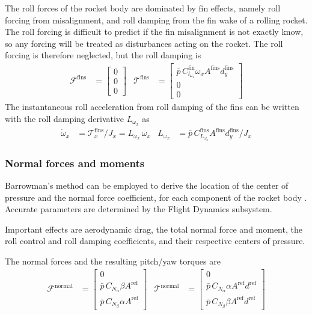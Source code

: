 The roll forces of the rocket body are dominated by fin effects, namely roll forcing from misalignment, and roll damping from the fin wake of a rolling rocket. 
The roll forcing is difficult to predict if the fin misalignment is not exactly know, so any forcing will be treated as disturbances acting on the rocket.
The roll forcing is therefore neglected, but the roll damping is 
\begin{align}
    \mathcal{F}^\text{fins} &= \begin{bmatrix} 0 \\ 0 \\ 0 \end{bmatrix}
    & 
    \mathcal{T}^\text{fins} &= \begin{bmatrix} \bar p \, C^\text{fin}_{l_{\omega_x}} \omega_x A^\text{fins} d^\text{fins}_y \\ 0 \\ 0 \end{bmatrix}
\end{align}
The instantaneous roll acceleration from roll damping of the fins can be written with the roll damping derivative $L_{\omega_x}$ as 
\begin{align}
    \dot \omega_x &= \mathcal{T}^\text{fins}_x / J_x = L_{\omega_x} \, \omega_x
    & 
    L_{\omega_x} &= \bar p \, C^\text{fins}_{L_{\omega_x}} A^\text{fins} d^\text{fins}_y / J_x
    \label{eq:model-aero-fins}
\end{align}


\subsubsection{Normal forces and moments}
Barrowman's method can be employed to derive the location of the center of pressure and the normal force coefficient, for each component of the rocket body \cite{barrowman1967, niskanen2009}.
Accurate parameters are determined by the Flight Dynamics subsystem.

Important effects are aerodynamic drag, the total normal force and moment, the roll control and roll damping coefficients, and their respective centers of pressure.

The normal forces and the resulting pitch/yaw torques are 
\begin{align}
    \mathcal{F}^\text{normal} &= 
    \begin{bmatrix} 
    0 \\ 
    \bar p \, C_{N_\alpha} \beta A^\text{ref} \\ 
    \bar p \, C_{N_\beta} \alpha A^\text{ref}
    \end{bmatrix}
    & 
    \mathcal{T}^\text{normal} &= 
    \begin{bmatrix} 
    0 \\
    \bar p \, C_{N_\alpha} \alpha A^\text{ref} d^\text{ref} \\
    \bar p \, C_{N_\beta} \beta A^\text{ref} d^\text{ref}
    \end{bmatrix} \label{eq:model-aero-normal}
\end{align}


